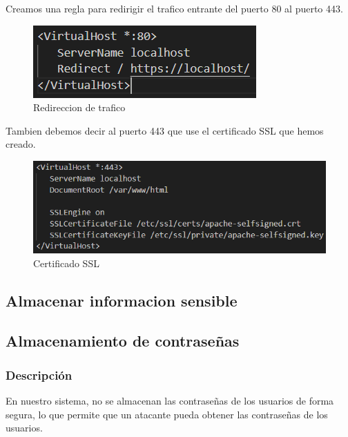 \documentclass{report}
\begin{document}
                    Creamos una regla para redirigir el trafico entrante del puerto 80 al puerto 443.
                    \begin{figure}[H]
                        \centering
                        \includegraphics[width=\textwidth]{./img/vulnerabilidades/3.2.1.1.png}
                        \caption{Redireccion de trafico}
                    \end{figure}
                    
                    Tambien debemos decir al puerto 443 que use el certificado SSL que hemos creado.
                    \begin{figure}[H]
                        \centering
                        \includegraphics[width=\textwidth]{./img/vulnerabilidades/3.2.1.2.png}
                        \caption{Certificado SSL}
                    \end{figure}
            \clearpage
            \subsection{Almacenar informacion sensible}
            \clearpage
            \subsection{Almacenamiento de contraseñas}
                \subsubsection{Descripción}
                    En nuestro sistema, no se almacenan las contraseñas de los usuarios de forma segura, lo que permite que un atacante pueda obtener las contraseñas de los usuarios.
\end{document}
